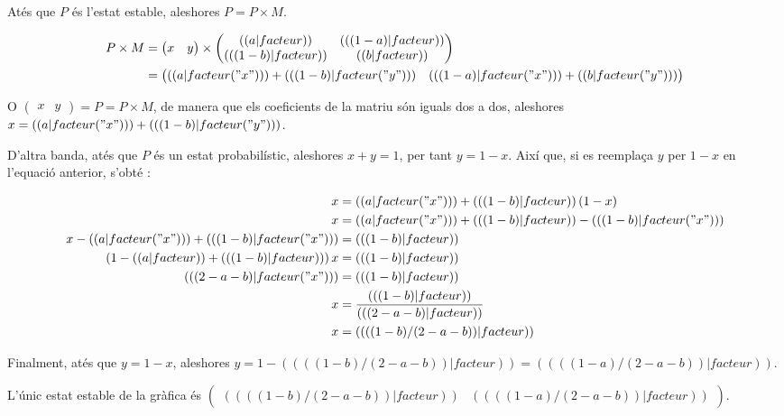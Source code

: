 \exercice*
Atés que $P$ és l'estat estable, aleshores $P=P\times M$.

\begin{align*}
    P\times M &= \begin{pmatrix}x&y\end{pmatrix}\times
\begin{pmatrix}
  (( a|facteur )) & (( (1-a)|facteur )) \\
  (( (1-b)|facteur )) & (( b|facteur )) \\
\end{pmatrix}\\
&= \begin{pmatrix}
  (( a|facteur("x") )) + (( (1-b)|facteur("y") )) & (( (1-a)|facteur("x") )) + (( b|facteur("y") ))
\end{pmatrix}
\end{align*}

O $\begin{pmatrix}x&y\end{pmatrix}=P=P\times M$, de manera que els coeficients de la matriu són iguals dos a dos, aleshores $x=(( a|facteur("x") )) + (( (1-b)|facteur("y") ))$.

D'altra banda, atés que $P$ és un estat probabilístic, aleshores $x+y=1$, per tant $y=1-x$. Així que, si es reemplaça $y$ per $1-x$ en l'equació anterior, s'obté :

\begin{align*}
  x &= (( a|facteur("x") )) + (( (1-b)|facteur ))\,(1-x) \\
  x &= (( a|facteur("x") )) + (( (1-b)|facteur )) - (( (1-b)|facteur("x") ))\\
  x-(( a|facteur("x") )) +(( (1-b)|facteur("x") )) &= (( (1-b)|facteur ))\\
  (1-(( a|facteur ))+(( (1-b)|facteur ))) \,x &= (( (1-b)|facteur ))\\
  (( (2-a-b)|facteur("x") )) &= (( (1-b)|facteur ))\\
  x &= \frac{(( (1-b)|facteur ))}{(( (2-a-b)|facteur ))}\\
x &= (( ((1-b)/(2-a-b))|facteur ))
\end{align*}

Finalment, atés que $y=1-x$, aleshores $y=1-(( ((1-b)/(2-a-b))|facteur ))=(( ((1-a)/(2-a-b))|facteur ))$.

L'únic estat estable de la gràfica és $\begin{pmatrix}
(( ((1-b)/(2-a-b))|facteur )) &
(( ((1-a)/(2-a-b))|facteur ))
\end{pmatrix}$.
